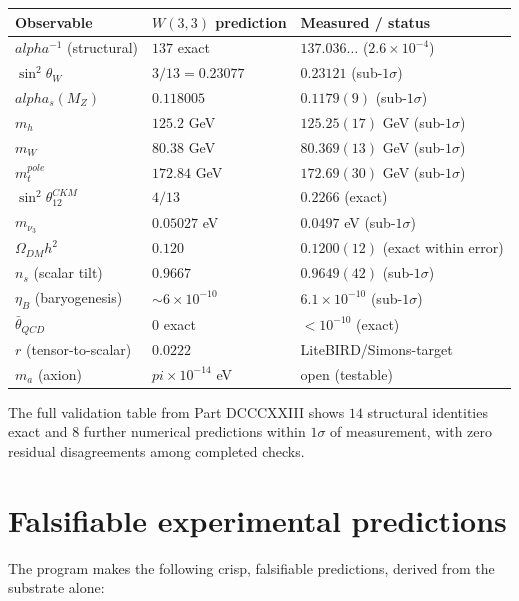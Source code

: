 \documentclass[11pt]{article}
\def\textbf#1{#1}%
\def\text#1{#1}%
\def\alpha{alpha}%
\def\pi{pi}%
\begin{document}
\begin{center}
\small
\begin{tabular}{lll}
\toprule
\textbf{Observable} & \textbf{$W(3,3)$ prediction} & \textbf{Measured / status} \\
\midrule
$\alpha^{-1}$ (structural) & $137$ exact & $137.036\ldots$ ($2.6\times10^{-4}$) \\
$\sin^2\theta_W$ & $3/13 = 0.23077$ & $0.23121$ (sub-$1\sigma$) \\
$\alpha_s(M_Z)$ & $0.118005$ & $0.1179(9)$ (sub-$1\sigma$) \\
$m_h$ & $125.2$ GeV & $125.25(17)$ GeV (sub-$1\sigma$) \\
$m_W$ & $80.38$ GeV & $80.369(13)$ GeV (sub-$1\sigma$) \\
$m_t^{\text{pole}}$ & $172.84$ GeV & $172.69(30)$ GeV (sub-$1\sigma$) \\
$\sin^2\theta_{12}^{\text{CKM}}$ & $4/13$ & $0.2266$ (exact) \\
$m_{\nu_3}$ & $0.05027$ eV & $0.0497$ eV (sub-$1\sigma$) \\
$\Omega_{\text{DM}}h^2$ & $0.120$ & $0.1200(12)$ (exact within error) \\
$n_s$ (scalar tilt) & $0.9667$ & $0.9649(42)$ (sub-$1\sigma$) \\
$\eta_B$ (baryogenesis) & $\sim 6\times 10^{-10}$ & $6.1\times 10^{-10}$ (sub-$1\sigma$) \\
$\bar\theta_{\text{QCD}}$ & $0$ exact & $<10^{-10}$ (exact) \\
$r$ (tensor-to-scalar) & $0.0222$ & LiteBIRD/Simons-target \\
$m_a$ (axion) & $\pi\times 10^{-14}$ eV & open (testable) \\
\bottomrule
\end{tabular}
\end{center}

The full validation table from Part DCCCXXIII shows $14$ structural identities exact and $8$ further numerical predictions within $1\sigma$ of measurement, with zero residual disagreements among completed checks.

\section{Falsifiable experimental predictions}

The program makes the following crisp, falsifiable predictions, derived from the substrate alone:
\end{document}
